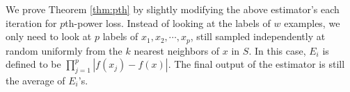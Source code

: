 We prove Theorem \ref{thm:pth} by slightly modifying the above estimator's each iteration for $p$th-power loss. Instead of looking at the labels of $w$ examples, we only need to look at $p$ labels of $x_1,x_2,\cdots, x_p$, still sampled independently at random uniformly from the $k$ nearest neighbors of $x$ in $S$. In this case, $E_i$ is defined to be $\prod\limits_{j=1}^p|f(x_j)-f(x)|$. The final output of the estimator is still the average of $E_i$'s.

